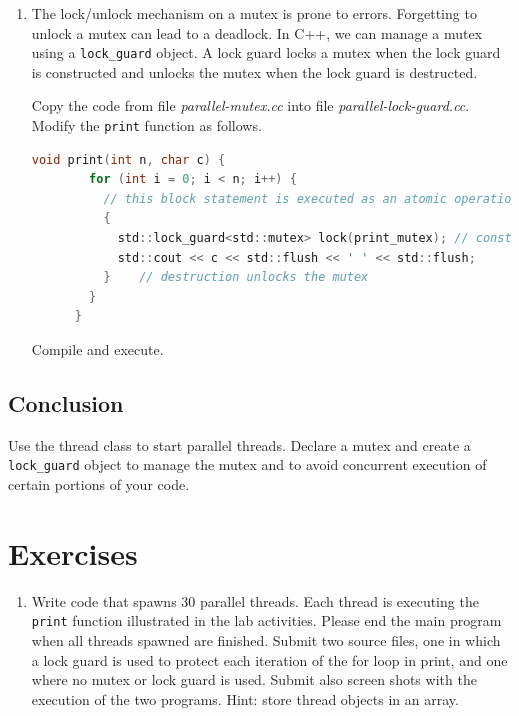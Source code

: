 \documentclass[12pt]{book}
\begin{document}
  \begin{enumerate}[resume*]
  \item The lock/unlock mechanism on a mutex is prone to errors. Forgetting to unlock a mutex can lead to a deadlock. In C++, we can manage a mutex using a \lstinline$lock_guard$ object. A lock guard locks a mutex when the lock guard is constructed and unlocks the mutex when the lock guard is destructed.

    Copy the code from file \emph{parallel-mutex.cc} into file \emph{parallel-lock-guard.cc}. Modify the \verb$print$ function as follows.

    \begin{lstlisting}[language=c]
      void print(int n, char c) {
        for (int i = 0; i < n; i++) {
          // this block statement is executed as an atomic operation;
          {
            std::lock_guard<std::mutex> lock(print_mutex); // construction locks the mutex
            std::cout << c << std::flush << ' ' << std::flush;
          }    // destruction unlocks the mutex 
        }
      }
    \end{lstlisting}

    Compile and execute.
  \end{enumerate}

  \subsection{Conclusion}

  Use the thread class to start parallel threads. Declare a mutex and create a \verb$lock_guard$ object to manage the mutex and to avoid concurrent execution of certain portions of your code.


  \section{Exercises}

  \begin{enumerate}[label=\arabic*.]
  \item Write code that spawns 30 parallel threads. Each thread is executing the \verb$print$ function illustrated in the lab activities. Please end the main program when all threads spawned are finished. Submit two source files, one in which a lock guard is used to protect each iteration of the for loop in print, and one where no mutex or lock guard is used. Submit also screen shots with the execution of the two programs. Hint: store thread objects in an array.
  \end{enumerate}
\end{document}

